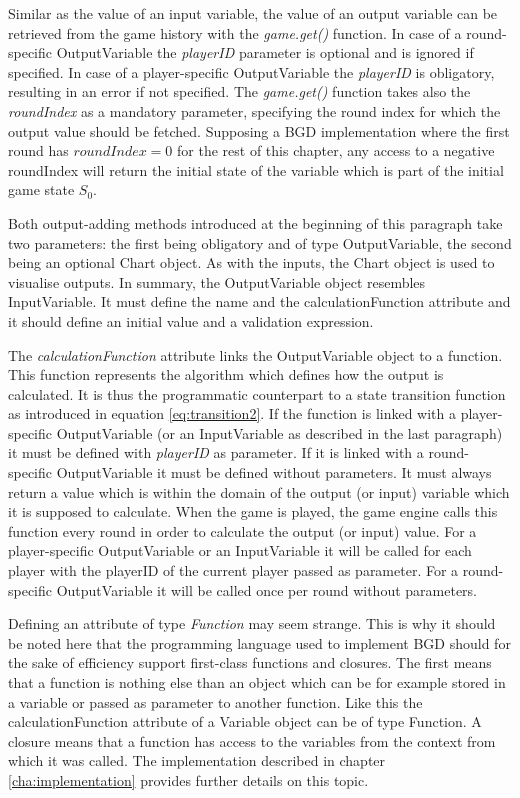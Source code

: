 Similar as the value of an input variable, the value of an output variable can be retrieved from the game history with the \textit{game.get()} function. In case of a round-specific OutputVariable the \textit{playerID} parameter is optional and is ignored if specified. In case of a player-specific OutputVariable the \textit{playerID} is obligatory, resulting in an error if not specified. The \textit{game.get()} function takes also the \textit{roundIndex} as a mandatory parameter, specifying the round index for which the output value should be fetched. Supposing a BGD implementation where the first round has $roundIndex = 0$ for the rest of this chapter, any access to a negative roundIndex will return the initial state of the variable which is part of the initial game state $S_0$.

Both output-adding methods introduced at the beginning of this paragraph take two parameters: the first being obligatory and of type OutputVariable, the second being an optional Chart object. As with the inputs, the Chart object is used to visualise outputs. In summary, the OutputVariable object resembles InputVariable. It must define the name and the calculationFunction attribute and it should define an initial value and a validation expression.

The \textit{calculationFunction} attribute links the OutputVariable object to a function. This function represents the algorithm which defines how the output is calculated. It is thus the programmatic counterpart to a state transition function as introduced in equation \ref{eq:transition2}. If the function is linked with a player-specific OutputVariable (or an InputVariable as described in the last paragraph) it must be defined with \textit{playerID} as parameter. If it is linked with a round-specific OutputVariable it must be defined without parameters. It must always return a value which is within the domain of the output (or input) variable which it is supposed to calculate. When the game is played, the game engine calls this function every round in order to calculate the output (or input) value. For a player-specific OutputVariable or an InputVariable it will be called for each player with the playerID of the current player passed as parameter. For a round-specific OutputVariable it will be called once per round without parameters. 

Defining an attribute of type \textit{Function} may seem strange. This is why it should be noted here that the programming language used to implement BGD should for the sake of efficiency support first-class functions and closures. The first means that a function is nothing else than an object which can be for example stored in a variable or passed as parameter to another function. Like this the calculationFunction attribute of a Variable object can be of type Function. A closure means that a function has access to the variables from the context from which it was called. The implementation described in chapter \ref{cha:implementation} provides further details on this topic.

